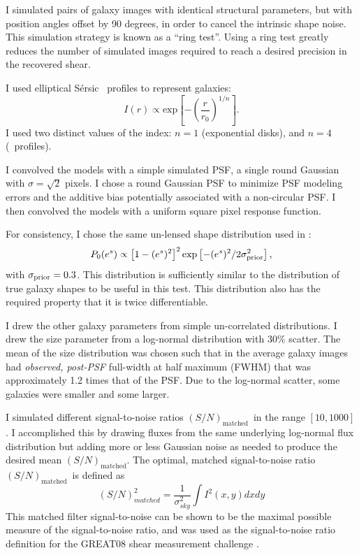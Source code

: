 \documentclass[12pt,preprint]{aastex}
\newcommand{\Msn}{$(S/N)_{\textrm{matched}}$}
\newcommand{\sersic}{S\'{e}rsic}
\newcommand{\lognormscatt}{30}
\begin{document}
I simulated pairs of galaxy images with identical structural parameters, but
with position angles offset by 90 degrees, in order to cancel the intrinsic
shape noise.  This simulation strategy is known as a ``ring
test''\citep{Nakajima2007}. Using a ring test greatly reduces the number of
simulated images required to reach a desired precision in the recovered shear.

I used elliptical \sersic\ \citep{Sersic63} profiles to represent galaxies:
\begin{equation}
I(r) \varpropto \mathrm{exp} \left[ -\left( \frac{r}{r_0} \right)^{1/n} \right].
\end{equation}
I used two distinct values of the index: $n=1$ (exponential
disks), and $n=4$ (\devauc\ profiles).

I convolved the models with a simple simulated PSF, a single round Gaussian
with $\sigma = \sqrt{2}$ pixels.  I chose a round Gaussian PSF to minimize PSF
modeling errors and the additive bias potentially associated with a
non-circular PSF.  I then convolved the models with a uniform square pixel
response function.


For consistency, I chose the same un-lensed shape distribution
used in \cite{ba14}:
\begin{equation}
P_0(e^s)\propto \left[1-(e^s)^2\right]^2 \exp\left[-(e^s)^2/2\sigma_{\rm prior}^2\right],
\end{equation}
with $\sigma_{\rm prior}=0.3$. This distribution is sufficiently similar to the
distribution of true galaxy shapes to be useful in this test.  This
distribution also has the required property that it is twice differentiable.

I drew the other galaxy parameters from simple un-correlated distributions.  I
drew the size parameter from a log-normal distribution with \lognormscatt\%
scatter.  The mean of the size distribution was chosen such that in the average
galaxy images had {\it observed, post-PSF} full-width at half maximum (FWHM)
that was approximately 1.2 times that of the PSF.  Due to the log-normal
scatter, some galaxies were smaller and some larger.

I simulated different signal-to-noise ratios \Msn\ in the range $[10,1000]$.  I
accomplished this by drawing fluxes from the same underlying log-normal flux
distribution but adding more or less Gaussian noise as needed to produce the
desired mean \Msn.  The optimal, matched signal-to-noise ratio \Msn\ is defined
as
\begin{equation}
    (S/N)^2_{matched} = \frac{1}{\sigma^2_{sky}} \int I^2(x,y) dx dy
\end{equation}
This matched filter signal-to-noise can be shown to be the maximal possible
measure of the signal-to-noise ratio, and was used as the signal-to-noise ratio
definition for the GREAT08 shear measurement challenge \citep{BridleGREAT08}.
\end{document}
